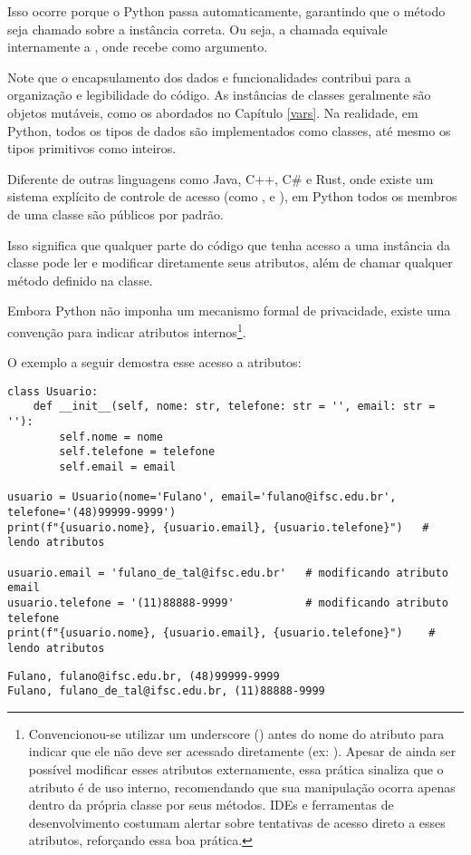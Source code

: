 Isso ocorre porque o Python passa  automaticamente, garantindo que o método seja chamado sobre a instância correta.
Ou seja, a chamada  equivale internamente a , onde  recebe
 como argumento.

Note que o encapsulamento dos dados e funcionalidades contribui para a organização e legibilidade do código.
As instâncias de classes geralmente são objetos mutáveis, como os abordados no Capítulo \ref{vars}.
Na realidade, em Python, todos os tipos de dados são implementados como classes, até mesmo os tipos primitivos como inteiros.

Diferente de outras linguagens como Java, C++, C\# e Rust, onde existe um sistema explícito de controle de
acesso (como ,  e ), em Python todos os membros
de uma classe são públicos por padrão.

Isso significa que qualquer parte do código que tenha acesso a uma instância da classe pode ler e modificar diretamente
seus atributos, além de chamar qualquer método definido na classe.

Embora Python não imponha um mecanismo formal de privacidade, existe uma convenção para indicar atributos
internos\footnote{Convencionou-se utilizar um underscore (\inlcode{_}) antes do nome do atributo para indicar que ele
não deve ser acessado diretamente (ex: ). Apesar de ainda ser possível modificar
esses atributos externamente, essa prática sinaliza que o atributo é de uso interno, recomendando que sua manipulação
ocorra apenas dentro da própria classe por seus métodos. IDEs e ferramentas de desenvolvimento costumam alertar sobre
tentativas de acesso direto a esses atributos, reforçando essa boa prática.}.



O exemplo a seguir demostra esse acesso a atributos:
\begin{verbatim}
class Usuario:
    def __init__(self, nome: str, telefone: str = '', email: str = ''):
        self.nome = nome
        self.telefone = telefone
        self.email = email

usuario = Usuario(nome='Fulano', email='fulano@ifsc.edu.br', telefone='(48)99999-9999')
print(f"{usuario.nome}, {usuario.email}, {usuario.telefone}")   # lendo atributos

usuario.email = 'fulano_de_tal@ifsc.edu.br'   # modificando atributo email
usuario.telefone = '(11)88888-9999'           # modificando atributo telefone
print(f"{usuario.nome}, {usuario.email}, {usuario.telefone}")    # lendo atributos
\end{verbatim}
\begin{verbatim}
Fulano, fulano@ifsc.edu.br, (48)99999-9999
Fulano, fulano_de_tal@ifsc.edu.br, (11)88888-9999
\end{verbatim}


